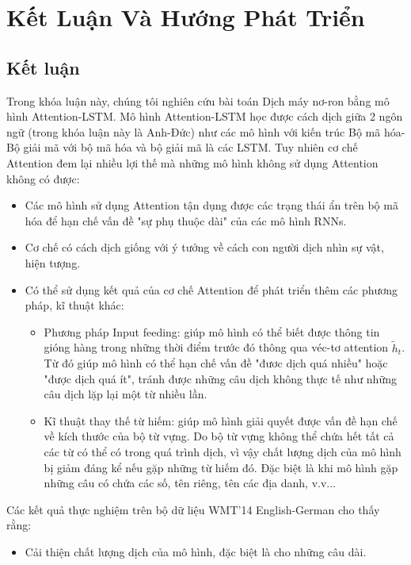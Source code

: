 \chapter{Kết Luận Và Hướng Phát Triển}
\ifpdf
    \graphicspath{{Chapter5/Chapter5Figs/PNG/}{Chapter5/Chapter5Figs/PDF/}{Chapter5/Chapter5Figs/}}
\else
    \graphicspath{{Chapter5/Chapter5Figs/EPS/}{Chapter5/Chapter5Figs/}}
\fi
\label{chap_5}

\section{Kết luận}

Trong khóa luận này, chúng tôi nghiên cứu bài toán Dịch máy nơ-ron bằng mô hình Attention-LSTM. Mô hình Attention-LSTM học được cách dịch giữa 2 ngôn ngữ (trong khóa luận này là Anh-Đức) như các mô hình với kiến trúc Bộ mã hóa-Bộ giải mã với bộ mã hóa và bộ giải mã là các LSTM. Tuy nhiên cơ chế Attention đem lại nhiều lợi thế mà những mô hình không sử dụng Attention không có được:
\begin{itemize}
	\item Các mô hình sử dụng Attention tận dụng được các trạng thái ẩn trên bộ mã hóa để hạn chế vấn đề "sự phụ thuộc dài" của các mô hình RNNs.
	\item Cơ chế có cách dịch giống với ý tưởng về cách con người dịch nhìn sự vật, hiện tượng.
	\item Có thể sử dụng kết quả của cơ chế Attention để phát triển thêm các phương pháp, kĩ thuật khác:
	\begin{itemize}
		\item Phương pháp Input feeding: giúp mô hình có thể biết được thông tin gióng hàng trong những thời điểm trước đó thông qua véc-tơ attention $\tilde{h}_t$. Từ đó giúp mô hình có thể hạn chế vấn đề "đươc dịch quá nhiều" hoặc "được dịch quá ít", tránh được những câu dịch không thực tế như những câu dịch lặp lại một từ nhiều lần.
		\item Kĩ thuật thay thế từ hiếm: giúp mô hình giải quyết được vấn đề hạn chế về kích thước của bộ từ vựng. Do bộ từ vựng không thể chứa hết tất cả các từ có thể có trong quá trình dịch, vì vậy chất lượng dịch của mô hình bị giảm đáng kể nếu  gặp những từ hiếm đó. Đặc biệt là khi mô hình gặp những câu có chứa các số, tên riêng, tên các địa danh, v.v... 
	\end{itemize}
\end{itemize}

Các kết quả thực nghiệm trên bộ dữ liệu WMT'14 English-German cho thấy rằng:
\begin{itemize}
	\item Cải thiện chất lượng dịch của mô hình, đặc biệt là cho những câu dài.
\end{itemize}



